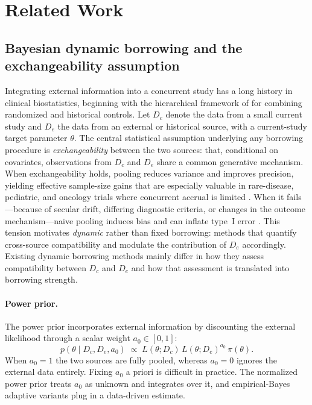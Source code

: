 \section{Related Work}
\label{sec:related}

\subsection{Bayesian dynamic borrowing and the exchangeability assumption}

Integrating external information into a concurrent study has a long history
in clinical biostatistics, beginning with the hierarchical framework of
\citet{pocock1976combination} for combining randomized and historical
controls.
Let $D_c$ denote the data from a small current study and $D_e$ the data from
an external or historical source, with a current-study target parameter
$\theta$.
The central statistical assumption underlying any borrowing procedure is
\emph{exchangeability} between the two sources: that, conditional on
covariates, observations from $D_c$ and $D_e$ share a common generative
mechanism.
When exchangeability holds, pooling reduces variance and improves
precision, yielding effective sample-size gains that are especially valuable
in rare-disease, pediatric, and oncology trials where concurrent accrual is
limited \citep{berry2013bayesian,ventz2019design,edwards2024using}.
When it fails---because of secular drift, differing diagnostic criteria, or
changes in the outcome mechanism---naive pooling induces bias and can inflate
type~I error \citep{viele2014use,koppschneider2020power,psioda2019bayesian}.
This tension motivates \emph{dynamic} rather than fixed borrowing: methods
that quantify cross-source compatibility and modulate the contribution of
$D_e$ accordingly.
Existing dynamic borrowing methods mainly differ in how they assess
compatibility between $D_c$ and $D_e$ and how that assessment is translated
into borrowing strength.

\paragraph{Power prior.}
The power prior \citep{ibrahim2000power,ibrahim2015power} incorporates
external information by discounting the external likelihood through a scalar
weight $a_0 \in [0,1]$:
\begin{equation}
p(\theta \mid D_c, D_e, a_0)
\;\propto\;
L(\theta; D_c)\,L(\theta; D_e)^{a_0}\,\pi(\theta).
\end{equation}
When $a_0 = 1$ the two sources are fully pooled, whereas $a_0 = 0$ ignores
the external data entirely.
Fixing $a_0$ a priori is difficult in practice.
The normalized power prior \citep{duan2006evaluating,ye2022normalized} treats
$a_0$ as unknown and integrates over it, and empirical-Bayes adaptive
variants \citep{gravestock2017adaptive} plug in a data-driven estimate.

